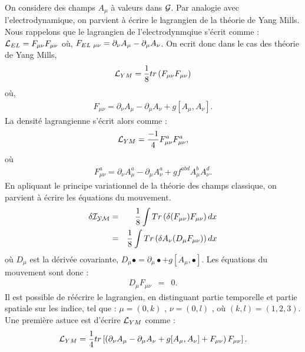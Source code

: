\documentclass[a4paper,11pt]{article}
\theoremstyle{plain}
\theoremstyle{definition}
\theoremstyle{remark}
\numberwithin{equation}{section}
\numberwithin{equation}{subsection}
\numberwithin{figure}{section}
\begin{document}
\noindent
On considere des champs $A_{\mu}$ à valeurs dans $\cal{G}$. Par analogie avec l'electrodynamique, on parvient à écrire le lagrangien 
de la théorie de Yang Mills. Nous rappelons que le lagrangien de l'electrodynmqiue s'écrit comme : $\mathcal{L}_{\small EL} = F_{\mu\nu}F_{\mu \nu}$ 
où, $F_{EL \hspace{1mm} \mu \nu}= \partial_{\nu}A_{\mu} - \partial_{\mu}A_{\nu}$. On ecrit donc dans le cas des théorie de Yang Mills,
\begin{eqnarray}
\mathcal{L}_{\small YM} = \frac{1}{8} tr\left(F_{\mu\nu}F_{\mu \nu}\right)
\end{eqnarray}
où,
\begin{eqnarray}
F_{\mu \nu}=\partial_{\nu}A_{\mu} - \partial_{\mu}A_{\nu} + g[A_{\mu},A_{\nu}].
\end{eqnarray}
La densité lagrangienne s'écrit alors comme :
\begin{eqnarray}
\mathcal{L}_{\small YM} = \frac{-1}{4} F^{a}_{\mu\nu}F^{a}_{\mu \nu},
\end{eqnarray}
où
\begin{eqnarray}
F^{a}_{\mu \nu}=\partial_{\nu}A^{a}_{\mu} - \partial_{\mu}A^{a}_{\nu} + gf^{abd}A^{b}_{\mu}A^{d}_{\nu}.
\end{eqnarray}
En apliquant le principe variationnel de la théorie des champs classique, on parvient à écrire les équations du mouvement.
\begin{eqnarray}
 \delta \cal{I}_{YM}  &=&  \frac{1}{8}  \int  Tr\left(\delta ( F_{\mu \nu} ) F_{\mu \nu} \right) dx \\
                                    &=&  \frac{1}{8}  \int  Tr\left(\delta A_{\nu} ( D_{\mu} F_{\mu \nu} )  \right) dx
\end{eqnarray}
où $D_{\mu}$ est la dérivée covariante, $D_{\mu} \bullet  =  \partial_{\mu} \bullet  + g [ A_{\mu} , \bullet ] $.
Les équations du mouvement sont donc :
\begin{eqnarray}
D_{\mu} F_{\mu \nu} &=&  0.
\end{eqnarray}
Il est possible de réécrire le lagrangien, en distinguant partie temporelle et partie spatiale sur les indice, tel que : 
$\mu = (0,k)$ , $\nu = (0,l)$ , où $(k,l) = (1, 2, 3)$. Une première astuce est d'écrire $\mathcal{L}_{\small YM}$ comme :
\begin{equation}
 \mathcal{L}_{\small YM} = \frac{1}{4} tr\left[ \left( \partial_{\nu}A_{\mu} - \partial_{\mu}A_{\nu} + g[A_{\mu},A_{\nu}] 
+ F_{\mu\nu} \right)F_{\mu \nu}\right].
\end{equation}
\end{document}

